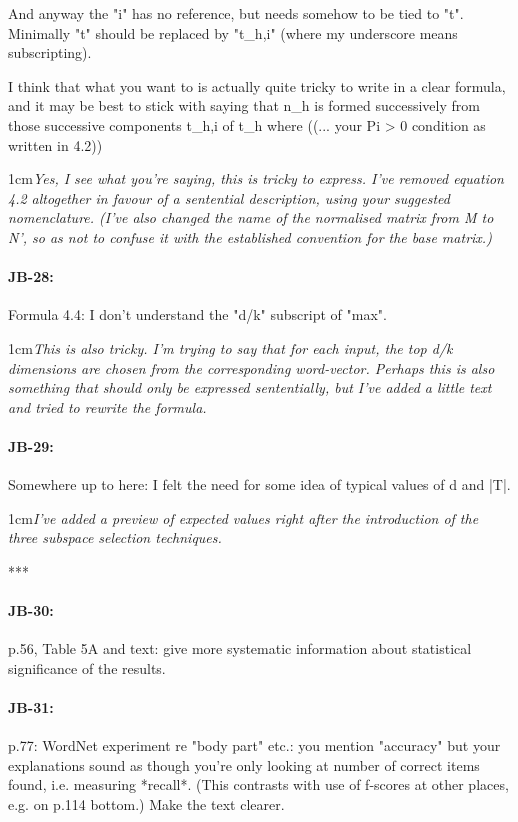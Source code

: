 \documentclass[11pt,a4paper]{article}
\newcommand{\res}[1]{\vspace{0.25cm} \begin{adjustwidth}{1cm}{}\emph{#1}\end{adjustwidth}}
\begin{document}
And anyway the "i" has no reference, but needs somehow to be tied to "t". Minimally "t" should be replaced by "t\_h,i" (where my underscore means subscripting).

I think that what you want to is actually quite tricky to write in a clear formula, and it may be best to stick with saying that n\_h is formed successively from those successive components t\_h,i of t\_h where ((... your Pi > 0 condition as written in 4.2))

\res{Yes, I see what you're saying, this is tricky to express.  I've removed equation 4.2 altogether in favour of a sentential description, using your suggested nomenclature.  (I've also changed the name of the normalised matrix from M to N', so as not to confuse it with the established convention for the base matrix.)}

\paragraph{JB-28:} Formula 4.4: I don't understand the "d/k" subscript of "max".

\res{This is also tricky.  I'm trying to say that for each input, the top d/k dimensions are chosen from the corresponding word-vector.  Perhaps this is also something that should only be expressed sententially, but I've added a little text and tried to rewrite the formula.}

\paragraph{JB-29:} Somewhere up to here: I felt the need for some idea of typical values of d and |T|.

\res{I've added a preview of expected values right after the introduction of the three subspace selection techniques.}

***\paragraph{JB-30:} p.56, Table 5A and text: give more systematic information about statistical significance of the results.

\paragraph{JB-31:} p.77: WordNet experiment re "body part" etc.: you mention "accuracy" but your explanations sound as though you're only looking at number of correct items found, i.e. measuring *recall*. (This contrasts with use of f-scores at other places, e.g. on p.114 bottom.) Make the text clearer.
\end{document}
